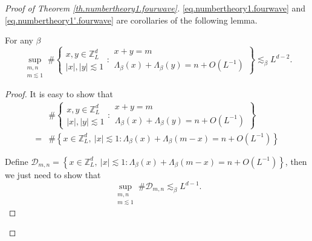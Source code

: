 
\begin{proof}[Proof of Theorem \ref{th.numbertheory1.fourwave}]\eqref{eq.numbertheory1.fourwave} and \eqref{eq.numbertheory1'.fourwave} are corollaries of the following lemma. 

\begin{lem}\label{lem.rationallemma.fourwave} For any $\beta$
\begin{equation}
    \sup_{\substack{m,n\\m\lesssim 1}} \#\left\{\begin{array}{cc}
         x,y\in\mathbb{Z}^d_L  \\
         |x|,|y|\lesssim 1
    \end{array}:\begin{array}{cc}
         x+y=m  \\
         \Lambda_{\beta}(x)+\Lambda_{\beta}(y)=n+O(L^{-1})
    \end{array}\right\}\lesssim_{\beta} L^{d-2} .
\end{equation}
\end{lem}
\begin{proof}
It is easy to show that
\begin{equation}
\begin{split}
    &\#\left\{\begin{array}{cc}
         x,y\in\mathbb{Z}^d_L  \\
         |x|,|y|\lesssim 1
    \end{array}:\begin{array}{cc}
         x+y=m  \\
         \Lambda_{\beta}(x)+\Lambda_{\beta}(y)=n+O(L^{-1})
    \end{array}\right\}
    \\
    =&\#\left\{
         x\in \mathbb{Z}^d_L,\ |x|\lesssim 1:\Lambda_{\beta}(x)+\Lambda_{\beta}(m-x)=n+O(L^{-1})\right\}
\end{split}
\end{equation}

Define $\mathcal{D}_{m,n}=\left\{x\in \mathbb{Z}^d_L,\ |x|\lesssim 1: \Lambda_{\beta}(x)+\Lambda_{\beta}(m-x)=n+O(L^{-1})\right\}$, then we just need to show that 
\begin{equation}\label{eq.goalofrationallemma.fourwave}
    \sup_{\substack{m,n\\m\lesssim 1}} \#\mathcal{D}_{m,n}\lesssim_{\beta} L^{d-1} .
\end{equation}


\end{proof}
\end{proof}
